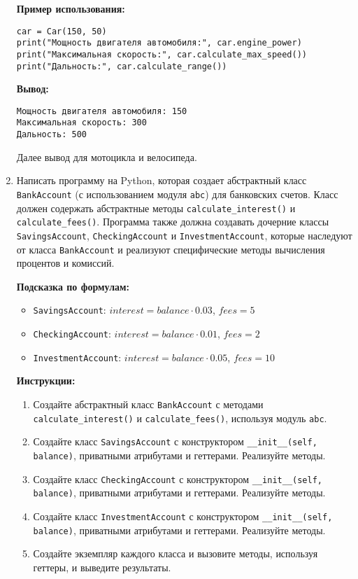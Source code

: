 \begin{enumerate}
\textbf{Пример использования:}
\begin{verbatim}
car = Car(150, 50)
print("Мощность двигателя автомобиля:", car.engine_power)
print("Максимальная скорость:", car.calculate_max_speed())
print("Дальность:", car.calculate_range())
\end{verbatim}

\textbf{Вывод:}
\begin{verbatim}
Мощность двигателя автомобиля: 150
Максимальная скорость: 300
Дальность: 500
\end{verbatim}

Далее вывод для мотоцикла и велосипеда.

\item
Написать программу на Python, которая создает абстрактный класс \texttt{BankAccount} (с использованием модуля \texttt{abc}) для банковских счетов. 
Класс должен содержать абстрактные методы \texttt{calculate\_interest()} и \texttt{calculate\_fees()}. 
Программа также должна создавать дочерние классы \texttt{SavingsAccount}, \texttt{CheckingAccount} и \texttt{InvestmentAccount}, 
которые наследуют от класса \texttt{BankAccount} и реализуют специфические методы вычисления процентов и комиссий.

\textbf{Подсказка по формулам:}
\begin{itemize}
    \item \texttt{SavingsAccount}: $interest = balance \cdot 0.03$, $fees = 5$
    \item \texttt{CheckingAccount}: $interest = balance \cdot 0.01$, $fees = 2$
    \item \texttt{InvestmentAccount}: $interest = balance \cdot 0.05$, $fees = 10$
\end{itemize}

\textbf{Инструкции:}
\begin{enumerate}
    \item Создайте абстрактный класс \texttt{BankAccount} с методами \texttt{calculate\_interest()} и \texttt{calculate\_fees()}, используя модуль \texttt{abc}.
    \item Создайте класс \texttt{SavingsAccount} с конструктором \texttt{\_\_init\_\_(self, balance)}, приватными атрибутами и геттерами. Реализуйте методы.
    \item Создайте класс \texttt{CheckingAccount} с конструктором \texttt{\_\_init\_\_(self, balance)}, приватными атрибутами и геттерами. Реализуйте методы.
    \item Создайте класс \texttt{InvestmentAccount} с конструктором \texttt{\_\_init\_\_(self, balance)}, приватными атрибутами и геттерами. Реализуйте методы.
    \item Создайте экземпляр каждого класса и вызовите методы, используя геттеры, и выведите результаты.
\end{enumerate}


\end{enumerate}
